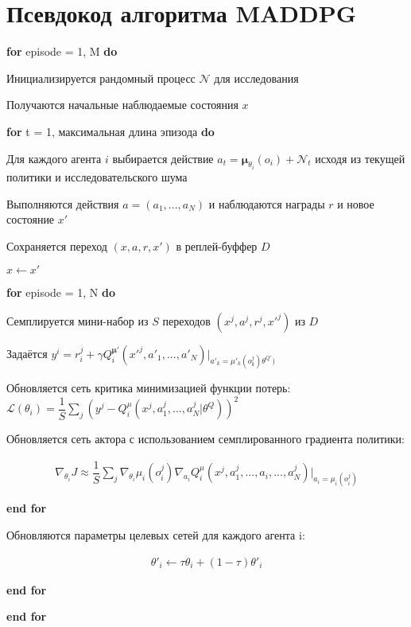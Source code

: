 \chapter{Псевдокод алгоритма MADDPG}\label{appendix-maddpg-alg} %

\setlength{\parindent}{0em}

\textbf{for} episode = 1, M \textbf{do}

\setlength{\parindent}{1em}

Инициализируется рандомный процесс $\mathcal{N}$ для исследования

Получаются начальные наблюдаемые состояния $x$

\textbf{for} t = 1, максимальная длина эпизода \textbf{do}

\setlength{\parindent}{2em}

Для каждого агента $i$ выбирается действие $a_t = \mathbf{\mu}_{\theta_i} (o_i) + \mathcal{N}_t$ исходя из текущей политики и исследовательского шума

Выполняются действия $a = (a_1, ..., a_N)$ и наблюдаются награды $r$ и новое состояние $x'$

Сохраняется переход $(x, a, r, x')$ в реплей-буффер $D$

$x \leftarrow x'$

\textbf{for} episode = 1, N \textbf{do}

\setlength{\parindent}{3em}

Семплируется мини-набор из $S$ переходов $(x^j, a^j, r^j, x'^j)$ из $D$

Задаётся $y^i = r^j_i + \gamma Q^{\mathbf{\mu}'}_i (x'^j, a'_1, ..., a'_N)| _{a'_k = \mu'_k(o^j_k) \theta^{Q'})}$

Обновляется сеть критика минимизацией функции потерь: $\mathcal{L}(\theta_i) = \dfrac{1}{S} \sum_{j} (y^j - Q^\mu_i(x^j, a^j_1, ..., a^j_N | \theta^Q))^2$

Обновляется сеть актора с использованием семплированного градиента политики:

\begin{equation}
    \begin{multlined}
        \nabla_{\theta_i} J \approx \dfrac{1}{S} \sum_{j} \nabla_{\theta_i} \mu_i (o^j_i) \nabla_{a_i}Q^\mu_i(x^j, a^j_1, ..., a_i, ..., a^j_N) | _{a_i=\mu_i(o^j_i)}
    \end{multlined}
\end{equation}

\setlength{\parindent}{2em}

\textbf{end for}

Обновляются параметры целевых сетей для каждого агента i:

\begin{equation}
    \begin{multlined}
        \theta'_i \leftarrow \tau \theta_i + (1 - \tau) \theta'_i
    \end{multlined}
\end{equation}

\setlength{\parindent}{1em}

\textbf{end for}

\setlength{\parindent}{0em}

\textbf{end for}

\setlength{\parindent}{2.5em}
